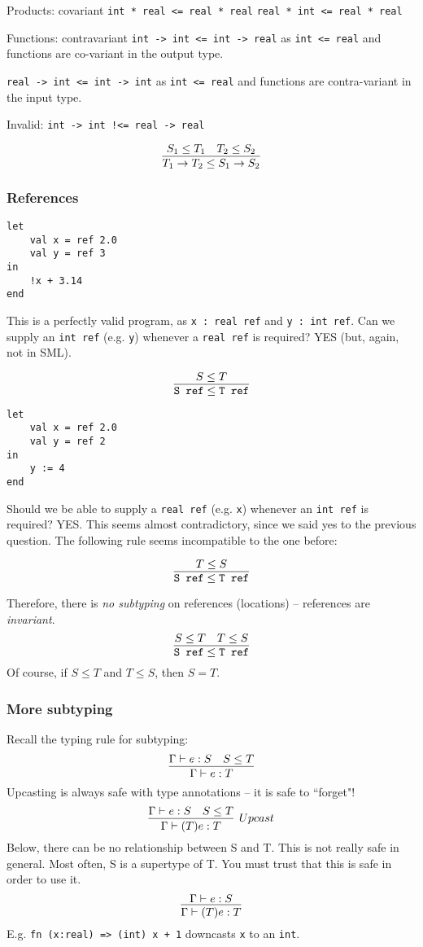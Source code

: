 \documentclass[11pt]{article}
\begin{document}
Products: covariant \verb~int * real <= real * real~ \verb~real * int <= real * real~

Functions: contravariant \verb~int -> int <= int -> real~ as \verb~int <= real~ and functions are co-variant in the output type.

\verb~real -> int <= int -> int~ as \verb~int <= real~ and functions are contra-variant in the input type.

Invalid: \verb~int -> int !<= real -> real~

\[
    \infer{T_1 \rightarrow T_2 \leq S_1 \rightarrow S_2}{
        S_1 \leq T_1
        &
        T_2 \leq S_2
    }
\]

\subsubsection{References}
\begin{verbatim}
let
    val x = ref 2.0
    val y = ref 3
in
    !x + 3.14
end
\end{verbatim}
This is a perfectly valid program, as \verb~x : real ref~ and \verb~y : int ref~. Can we supply an \verb~int ref~ (e.g. \verb~y~) whenever a \verb~real ref~ is required? YES (but, again, not in SML).

\[
    \infer{\verb~S ref~ \leq \verb~T ref~}{ S \leq T }
\]

\begin{verbatim}
let
    val x = ref 2.0
    val y = ref 2
in
    y := 4 
end
\end{verbatim}

Should we be able to supply a \verb~real ref~ (e.g. \verb~x~) whenever an \verb~int ref~ is required? YES. This seems almost contradictory, since we said yes to the previous question. The following rule seems incompatible to the one before:

\[
    \infer{\verb~S ref~ \leq \verb~T ref~}{T \leq S}
\]

Therefore, there is \emph{no subtyping} on references (locations) -- references are \emph{invariant}.
\[
    \infer{\verb~S ref~ \leq \verb~T ref~}{
        S \leq T
        &
        T \leq S
    }
\]
Of course, if $S \leq T$ and $T \leq S$, then $S = T$.

\subsubsection{More subtyping}
Recall the typing rule for subtyping:
\[
    \infer{\Gamma \vdash e : T}{
        \Gamma \vdash e : S
        &
        S \leq T
    }
\] 
Upcasting is always safe with type annotations -- it is safe to ``forget"!
\[
    \infer[Upcast]{\Gamma \vdash (T) e : T}{
        \Gamma \vdash e : S
        &
        S \leq T
     }
\]
Below, there can be no relationship between S and T. This is not really safe in general. Most often, S is a supertype of T. You must trust that this is safe in order to use it.
\[
    \infer{\Gamma \vdash (T) e : T}{ \Gamma \vdash e : S}
\]
E.g. \verb~fn (x:real) => (int) x + 1~ downcasts \verb~x~ to an \verb~int~.
\end{document}
